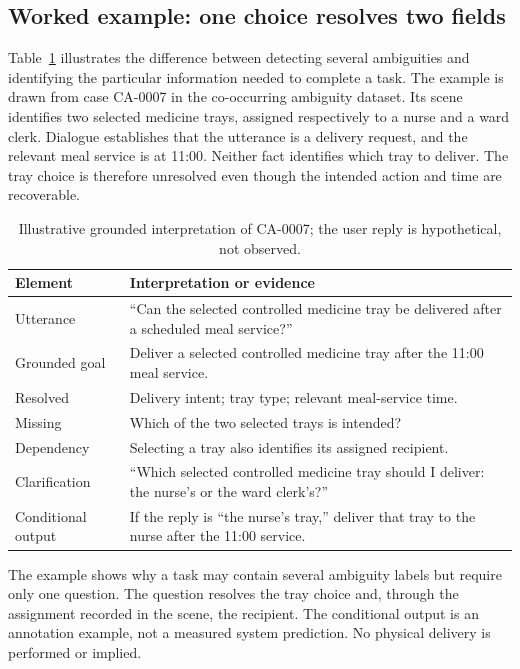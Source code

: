 \documentclass[10pt,conference]{IEEEtran}
\renewcommand{\arraystretch}{1.10}
\begin{document}
\subsection{Worked example: one choice resolves two fields}
Table~\ref{tab:worked} illustrates the difference between detecting several ambiguities and identifying the particular information needed to complete a task. The example is drawn from case CA-0007 in the co-occurring ambiguity dataset. Its scene identifies two selected medicine trays, assigned respectively to a nurse and a ward clerk. Dialogue establishes that the utterance is a delivery request, and the relevant meal service is at 11:00. Neither fact identifies which tray to deliver. The tray choice is therefore unresolved even though the intended action and time are recoverable.
\begin{table}[!tbp]
\caption{Illustrative grounded interpretation of CA-0007; the user reply is hypothetical, not observed.}
\label{tab:worked}
\centering\footnotesize
\renewcommand{\arraystretch}{1.26}
\begin{tabularx}{\columnwidth}{@{}p{}X@{}}
\toprule
\textbf{Element} & \textbf{Interpretation or evidence}\\
\midrule
Utterance & ``Can the selected controlled medicine tray be delivered after a scheduled meal service?''\\
Grounded goal & Deliver a selected controlled medicine tray after the 11:00 meal service.\\
Resolved & Delivery intent; tray type; relevant meal-service time.\\
Missing & Which of the two selected trays is intended?\\
Dependency & Selecting a tray also identifies its assigned recipient.\\
Clarification & ``Which selected controlled medicine tray should I deliver: the nurse's or the ward clerk's?''\\
Conditional output & If the reply is ``the nurse's tray,'' deliver that tray to the nurse after the 11:00 service.\\
\bottomrule
\end{tabularx}
\end{table}
The example shows why a task may contain several ambiguity labels but require only one question. The question resolves the tray choice and, through the assignment recorded in the scene, the recipient. The conditional output is an annotation example, not a measured system prediction. No physical delivery is performed or implied.
\FloatBarrier
\end{document}
